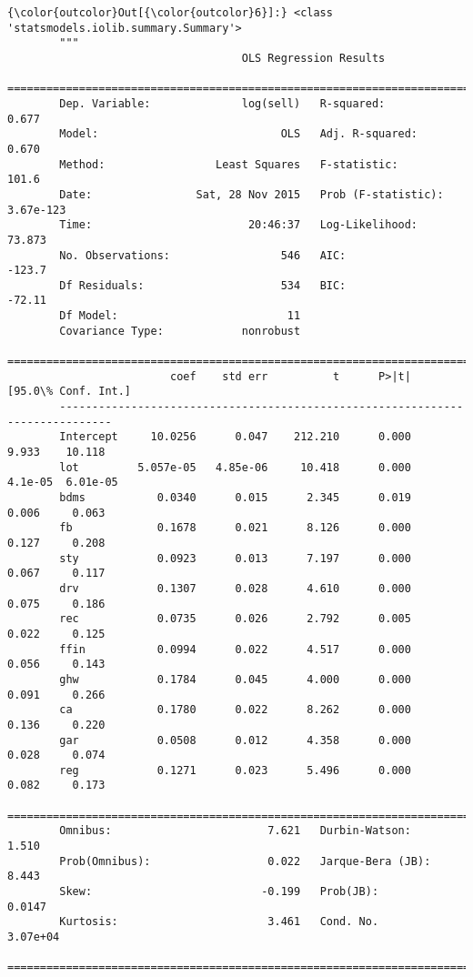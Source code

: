 \documentclass[11pt]{article}
\begin{document}
\begin{Verbatim}[commandchars=\\\{\}]
{\color{outcolor}Out[{\color{outcolor}6}]:} <class 'statsmodels.iolib.summary.Summary'>
        """
                                    OLS Regression Results                            
        ==============================================================================
        Dep. Variable:              log(sell)   R-squared:                       0.677
        Model:                            OLS   Adj. R-squared:                  0.670
        Method:                 Least Squares   F-statistic:                     101.6
        Date:                Sat, 28 Nov 2015   Prob (F-statistic):          3.67e-123
        Time:                        20:46:37   Log-Likelihood:                 73.873
        No. Observations:                 546   AIC:                            -123.7
        Df Residuals:                     534   BIC:                            -72.11
        Df Model:                          11                                         
        Covariance Type:            nonrobust                                         
        ==============================================================================
                         coef    std err          t      P>|t|      [95.0\% Conf. Int.]
        ------------------------------------------------------------------------------
        Intercept     10.0256      0.047    212.210      0.000         9.933    10.118
        lot         5.057e-05   4.85e-06     10.418      0.000       4.1e-05  6.01e-05
        bdms           0.0340      0.015      2.345      0.019         0.006     0.063
        fb             0.1678      0.021      8.126      0.000         0.127     0.208
        sty            0.0923      0.013      7.197      0.000         0.067     0.117
        drv            0.1307      0.028      4.610      0.000         0.075     0.186
        rec            0.0735      0.026      2.792      0.005         0.022     0.125
        ffin           0.0994      0.022      4.517      0.000         0.056     0.143
        ghw            0.1784      0.045      4.000      0.000         0.091     0.266
        ca             0.1780      0.022      8.262      0.000         0.136     0.220
        gar            0.0508      0.012      4.358      0.000         0.028     0.074
        reg            0.1271      0.023      5.496      0.000         0.082     0.173
        ==============================================================================
        Omnibus:                        7.621   Durbin-Watson:                   1.510
        Prob(Omnibus):                  0.022   Jarque-Bera (JB):                8.443
        Skew:                          -0.199   Prob(JB):                       0.0147
        Kurtosis:                       3.461   Cond. No.                     3.07e+04
        ==============================================================================
        

\end{Verbatim}
\end{document}
